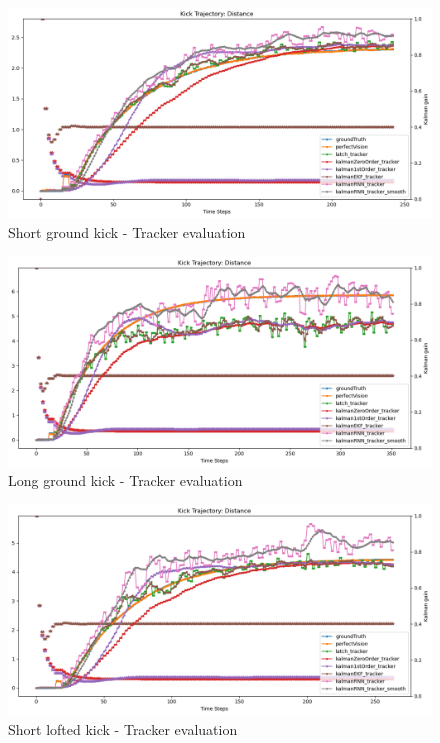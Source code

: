 \documentclass[a4paper,twoside,12pt]{report}
\begin{document}
\begin{figure}[h!]
\begin{center}
\includegraphics[width=12cm]{images/eval_ground_short.png}
\caption{Short ground kick - Tracker evaluation}
\label{fig:ekfgroundshort}
\end{center}
\end{figure}

\begin{figure}[h!]
\begin{center}
\includegraphics[width=12cm]{images/eval_ground_long.png}
\caption{Long ground kick - Tracker evaluation}
\label{fig:ekfgroundlong}
\end{center}
\end{figure}

\begin{figure}[h!]
\begin{center}
\includegraphics[width=12cm]{images/eval_loft_short.png}
\caption{Short lofted kick - Tracker evaluation}
\label{fig:ekfloftshort}
\end{center}
\end{figure}
\end{document}
